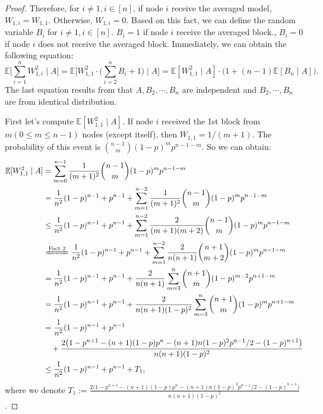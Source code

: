 \begin{lemma}
\begin{proof}
 Therefore, for $i\not=1, i\in [n]$, if node $i$ receive the averaged model, $W_{1,i} = W_{1,1}$. Otherwise, $W_{1,i} = 0$. Based on this fact, we can define the random variable $B_i$ for $i\not=1, i\in [n]$. $B_i = 1$ if node $i$ receive the averaged block., $B_i=0$ if node $i$ does not receive the averaged block. Immediately, we can obtain the following equation:
 \begin{equation} \label{eq: 21}
 	\mathbb{E} \Big[\sum\limits_{i=1}^n W_{1,i}^2\mid A\Big] = \mathbb{E}\Big[W_{1,1}^2\cdot\Big(\sum\limits_{i=2}^n B_i+1\Big)\mid A\Big] = \mathbb{E}[W_{1,1}^2 \mid A]\cdot\big(1+(n-1)\mathbb{E}[B_n\mid A]\big).
\end{equation}
The last equation results from that $A,B_2,\cdots, B_n$ are independent and $B_2, \cdots, B_n$ are from identical distribution.

First let's compute $\mathbb{E}[W_{1,1}^2 \mid A]$. If node $i$ received the 1st block from $m (0\le m \le n-1)$ nodes (except itself), then $W_{1,1} = 1/(m+1)$. The probability of this event is $\binom{n-1}{m}(1-p)^mp^{n-1-m}$. So we can obtain:
\begin{align*}
	\mathbb{E}[W_{1,1}^2 \mid A] &= \sum\limits_{m=0}^{n-1}\frac{1}{(m+1)^2}\binom{n-1}{m}(1-p)^mp^{n-1-m}\\
	&= \frac{1}{n^2}(1-p)^{n-1} + p^{n-1}+ \sum\limits_{m=1}^{n-2}\frac{1}{(m+1)^2}\binom{n-1}{m}(1-p)^mp^{n-1-m}\\
	&\le \frac{1}{n^2}(1-p)^{n-1} + p^{n-1}+\sum\limits_{m=1}^{n-2}\frac{2}{(m+1)(m+2)}\binom{n-1}{m}(1-p)^mp^{n-1-m}\\
	&\xlongequal{\text{Fact 2}}\frac{1}{n^2}(1-p)^{n-1}  + p^{n-1}+\sum\limits_{m=1}^{n-2}\frac{2}{n(n+1)}\binom{n+1}{m+2}(1-p)^mp^{n-1-m}\\
	&=\frac{1}{n^2}(1-p)^{n-1} + p^{n-1}+\frac{2}{n(n+1)}\sum\limits_{m=3}^{n}\binom{n+1}{m}(1-p)^{m-2}p^{n+1-m}\\
	&=\frac{1}{n^2}(1-p)^{n-1} + p^{n-1}
	  +\frac{2}{n(n+1)(1-p)^2}\sum\limits_{m=3}^{n}\binom{n+1}{m}(1-p)^{m}p^{n+1-m}\\
	&=\frac{1}{n^2}(1-p)^{n-1} +p^{n-1}\\
	& \quad + \frac{2\big(1-p^{n+1}-(n+1)(1-p)p^n - (n+1)n(1-p)^2p^{n-1}/2 - (1-p)^{n+1}\big)}{n(n+1)(1-p)^2}\\
	&\le \frac{1}{n^2}(1-p)^{n-1} + p^{n-1} +T_1,
\end{align*}
where we denote $T_1 := \frac{2\big(1-p^{n+1}-(n+1)(1-p)p^n - (n+1)n(1-p)^2p^{n-1}/2 - (1-p)^{n+1}\big)}{n(n+1)(1-p)^2}$.


\end{proof}
\end{lemma}
